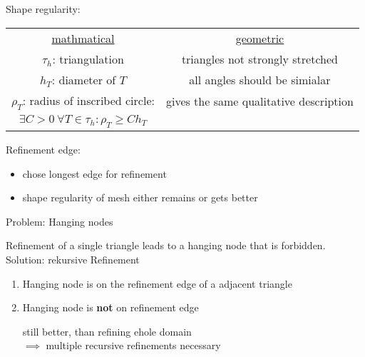 Shape regularity:
\begin{center}
	\begin{tabular}{c | c}
		\underline{mathmatical} & \underline{geometric}\\
		$\tau_h$:  triangulation & triangles not strongly stretched \\
		$h_T$:  diameter of $T$ & all angles should be \glqq simialar \grqq \\
		$\rho_T$:  radius of inscribed circle:	& gives the same qualitative description\\
		$\exists C > 0\ \forall T \in \tau_h \colon \rho_T \geq C h_T$ & 
	\end{tabular}
\end{center}


Refinement edge:
\begin{itemize}
	\item chose longest edge for refinement
	\item shape regularity of mesh either remains or gets better
\end{itemize}

Problem: Hanging nodes

Refinement of a single triangle leads to a hanging node that is forbidden.\\
Solution: rekursive Refinement
\begin{enumerate}[label= case \arabic*:]
	\item Hanging node is on the refinement edge of a adjacent triangle
	

	\item Hanging node is \textbf{not} on refinement edge
	
	still better, than refining ehole domain\\
	$\implies$ multiple recursive refinements necessary
\end{enumerate}


